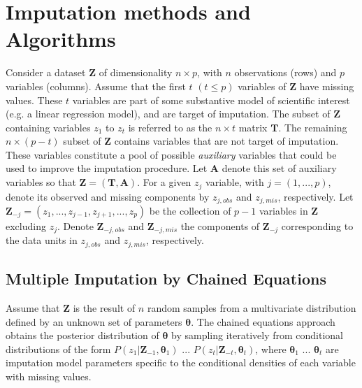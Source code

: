\section{Imputation methods and Algorithms} \label{secMethods}

Consider a dataset $\bm{Z}$ of dimensionality $n \times p$, with $n$ observations (rows) and 
$p$ variables (columns).
Assume that the first $t$ $(t \leq p)$ variables of $\bm{Z}$ have missing values.
These $t$ variables are part of some substantive model of scientific interest (e.g. a linear 
regression model), and are target of imputation.
The subset of $\bm{Z}$ containing variables $z_1$ to $z_t$ is referred to as the $n \times t$ matrix $\bm{T}$.
The remaining $n \times (p-t)$ subset of $\bm{Z}$ contains variables that are not target of imputation.
These variables constitute a pool of possible \emph{auxiliary} variables that could be used to improve 
the imputation procedure.
Let $\bm{A}$ denote this set of auxiliary variables so that $\bm{Z} = (\bm{T}, \bm{A})$.
For a given $z_j$ variable, with $j = (1, ..., p)$, denote its observed and missing components 
by $z_{j, obs}$ and $z_{j, mis}$, respectively.
Let $\bm{Z}_{-j} = (z_1, ..., z_{j-1}, z_{j+1}, ..., z_{p})$ be the collection of $p-1$ variables in 
$\bm{Z}$ excluding $z_j$.
Denote $\bm{Z}_{-j, obs}$ and $\bm{Z}_{-j, mis}$ the components of $\bm{Z}_{-j}$ corresponding to the
data units in $z_{j, obs}$ and $z_{j, mis}$, respectively.

\subsection{Multiple Imputation by Chained Equations}

Assume that $\bm{Z}$ is the result of $n$ random samples from a multivariate distribution defined by 
an unknown set of parameters $\bm{\theta}$.
The chained equations approach obtains the posterior distribution of $\bm{\theta}$ by sampling iteratively 
from conditional distributions of the form $P(z_{1}|\bm{Z}_{-1}, \bm{\theta}_{1})$ $...$ 
$P(z_{t}|\bm{Z}_{-t}, \bm{\theta}_{t})$, where $\bm{\theta}_{1}$ $...$ $\bm{\theta}_{t}$ are imputation model 
parameters specific to the conditional densities of each variable with missing values.

